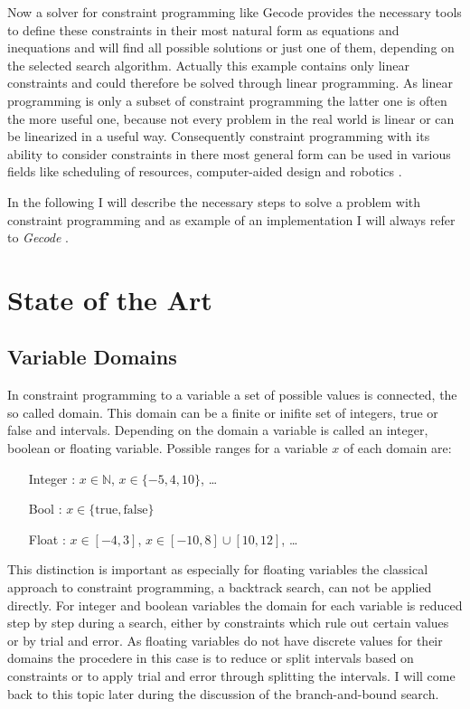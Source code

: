 \documentclass[10pt,
               a4paper,
               journal,
               ]{IEEEtran}
\begin{document}
	Now a solver for constraint programming like Gecode provides the necessary tools to define these constraints in their most natural form as equations and inequations and will find all possible solutions or just one of them, depending on the selected search algorithm. Actually this example contains only linear constraints and could therefore be solved through linear programming. As linear programming is only a subset of constraint programming the latter one is often the more useful one, because not every problem in the real world is linear or can be linearized in a useful way. Consequently constraint programming with its ability to consider constraints in there most general form can be used in various fields like scheduling of resources, computer-aided design and robotics \cite[p. 221]{trendsInCP}.
	
	In the following I will describe the necessary steps to solve a problem with constraint programming and as example of an implementation I will always refer to \emph{Gecode} \cite{gecode}.
	
	\section{State of the Art}
	\subsection{Variable Domains}
	In constraint programming to a variable a set of possible values is connected, the so called domain. This domain can be a finite or inifite set of integers, true or false and intervals. Depending on the domain a variable is called an integer, boolean or floating variable. Possible ranges for a variable $x$ of each domain are:
	\begin{itemize}
		\item[Integer]: $x \in \mathbb{N}$, $x \in \{-5, 4, 10\}$, \dots
		\item[Bool]: $x \in \{\text{true}, \text{false}\}$
		\item[Float]: $x \in [-4, 3]$, $x \in [-10, 8] \cup [10, 12]$, \dots
	\end{itemize}
	This distinction is important as especially for floating variables the classical approach to constraint programming, a backtrack search, can not be applied directly. For integer and boolean variables the domain for each variable is reduced step by step during a search, either by constraints which rule out certain values or by trial and error. As floating variables do not have discrete values for their domains the procedere in this case is to reduce or split intervals based on constraints or to apply trial and error through splitting the intervals. I will come back to this topic later during the discussion of the branch-and-bound search.
	
\end{document}
